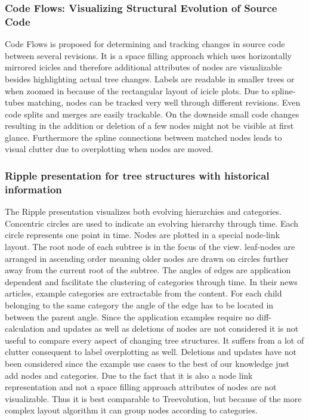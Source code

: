 \subsubsection{Code Flows: Visualizing Structural Evolution of Source Code\cite{telea2008code}}
Code Flows is proposed for determining and tracking changes in source code between several revisions. It is a space filling approach which uses horizontally mirrored icicles and therefore additional attributes of nodes are visualizable besides highlighting actual tree changes. Labels are readable in smaller trees or when zoomed in because of the rectangular layout of icicle plots. Due to spline-tubes matching, nodes can be tracked very well through different revisions. Even code splits and merges are easily trackable. On the downside small code changes resulting in the addition or deletion of a few nodes might not be visible at first glance. Furthermore the spline connections between matched nodes leads to visual clutter due to overplotting when nodes are moved.


\subsubsection{Ripple presentation for tree structures with historical information\cite{ishihara2006ripple}}
The Ripple presentation visualizes both evolving hierarchies and categories. Concentric circles are used to indicate an evolving hierarchy through time. Each circle represents one point in time. Nodes are plotted in a special node-link layout. The root node of each subtree is in the focus of the view. leaf-nodes are arranged in ascending order meaning older nodes are drawn on circles further away from the current root of the subtree. The angles of edges are application dependent and facilitate the clustering of categories through time. In their news articles, example categories are extractable from the content. For each child belonging to the same category the angle of the edge has to be located in between the parent angle. Since the application examples require no diff-calculation and updates as well as deletions of nodes are not considered it is not useful to compare every aspect of changing tree structures. It suffers from a lot of clutter consequent to label overplotting as well. Deletions and updates have not been considered since the example use cases to the best of our knowledge just add nodes and categories. Due to the fact that it is also a node link representation and not a space filling approach attributes of nodes are not visualizable. Thus it is best comparable to Treevolution, but because of the more complex layout algorithm it can group nodes according to categories. 

